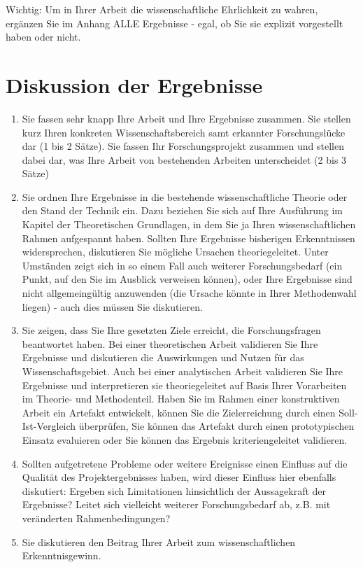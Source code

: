 \documentclass{article}
\begin{document}
Wichtig: Um in Ihrer Arbeit die wissenschaftliche Ehrlichkeit zu wahren, ergänzen Sie im Anhang ALLE Ergebnisse - egal, ob Sie sie explizit vorgestellt haben oder nicht.

\section{Diskussion der Ergebnisse}

\begin{enumerate}
    \item Sie fassen sehr knapp Ihre Arbeit und Ihre Ergebnisse zusammen.
Sie stellen kurz Ihren konkreten Wissenschaftsbereich samt erkannter Forschungslücke dar (1 bis 2 Sätze). 
Sie fassen Ihr Forschungsprojekt zusammen und stellen dabei dar, was Ihre Arbeit von bestehenden Arbeiten unterscheidet (2 bis 3 Sätze)
    \item Sie ordnen Ihre Ergebnisse in die bestehende wissenschaftliche Theorie oder den Stand der Technik ein.
Dazu beziehen Sie sich auf Ihre Ausführung im Kapitel der Theoretischen Grundlagen, in dem Sie ja Ihren wissenschaftlichen Rahmen aufgespannt haben. Sollten Ihre Ergebnisse bisherigen Erkenntnissen widersprechen, diskutieren Sie mögliche Ursachen theoriegeleitet.
Unter Umständen zeigt sich in so einem Fall auch weiterer Forschungsbedarf (ein Punkt, auf den Sie im Ausblick verweisen können), oder Ihre Ergebnisse sind nicht allgemeingültig anzuwenden (die Ursache könnte in Ihrer Methodenwahl liegen) - auch dies müssen Sie diskutieren. 
    \item Sie zeigen, dass Sie Ihre gesetzten Ziele erreicht, die Forschungsfragen beantwortet haben.
Bei einer theoretischen Arbeit validieren Sie Ihre Ergebnisse und diskutieren die Auswirkungen und Nutzen für das Wissenschaftsgebiet.
Auch bei einer analytischen Arbeit validieren Sie Ihre Ergebnisse und interpretieren sie theoriegeleitet auf Basis Ihrer Vorarbeiten im Theorie- und Methodenteil.
Haben Sie im Rahmen einer konstruktiven Arbeit ein Artefakt entwickelt, können Sie die Zielerreichung durch einen Soll-Ist-Vergleich überprüfen, Sie können das Artefakt durch einen prototypischen Einsatz evaluieren oder Sie können das Ergebnis kriteriengeleitet validieren. 
    \item Sollten aufgetretene Probleme oder weitere Ereignisse einen Einfluss auf die Qualität des Projektergebnisses haben, wird dieser Einfluss hier ebenfalls diskutiert: Ergeben sich Limitationen hinsichtlich der Aussagekraft der Ergebnisse? Leitet sich vielleicht weiterer Forschungsbedarf ab, z.B. mit veränderten Rahmenbedingungen?
    \item Sie diskutieren den Beitrag Ihrer Arbeit zum wissenschaftlichen Erkenntnisgewinn.
\end{enumerate}
\end{document}
